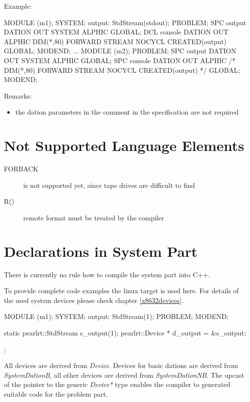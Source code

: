 Example:
\begin{PEARLCode}
MODULE (m1);
SYSTEM;
   output: StdStream(stdout);
PROBLEM;
   SPC output  DATION OUT SYSTEM ALPHIC GLOBAL;
   DCL console DATION OUT ALPHIC DIM(*,80) FORWARD STREAM NOCYCL CREATED(output) GLOBAL;
MODEND;
...
MODULE (m2);
PROBLEM;
   SPC output  DATION OUT SYSTEM ALPHIC GLOBAL;
   SPC console DATION OUT ALPHIC /* DIM(*,80) FORWARD STREAM NOCYCL CREATED(output) */ GLOBAL;
MODEND;
\end{PEARLCode}

Remarks:
\begin{itemize}
\item the dation parameters in the comment in the specification
   are not required 
\end{itemize}
\fi

\section{Not Supported Language Elements}
\begin{description}
\item[FORBACK] is not supported yet, since tape drives are
   difficult to find
\item[R()] remote format must be treated by the compiler
\end{description}

\section{Declarations in System Part}
There is currently no rule how to compile the system part into C++.

To provide complete code examples the linux target is used here.
For details of the used system devices please check chapter \ref{x8632devices}.

\begin{PEARLCode}
MODULE (m1);
SYSTEM;
   output: StdStream(1);
PROBLEM;
MODEND;
\end{PEARLCode}

\begin{CppCode}
static pearlrt::StdStream s_output(1);
       pearlrt::Device * d_output = &s_output;
\end{CppCode};

All devices are derived from {\em Device}.
Devices for basic dations are derived from {\em SystemDationB},
all other devices are derived from {\em SystemDationNB}.
The upcast of the pointer
to the generic {\em Device*} type enables the compiler to generated 
suitable code for the problem part.

